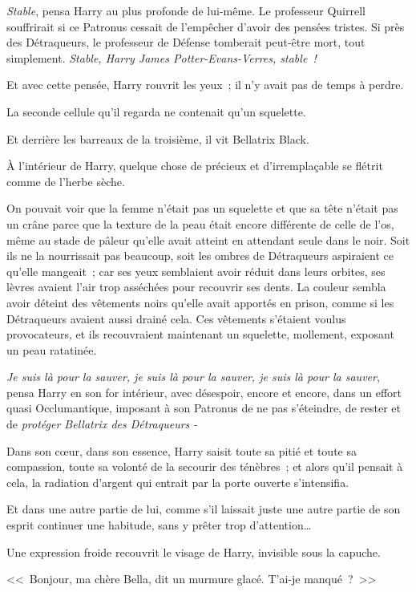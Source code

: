 \emph{Stable}, pensa Harry au plus profonde de lui-même. Le professeur Quirrell souffrirait si ce Patronus cessait de l'empêcher d'avoir des pensées tristes. Si près des Détraqueurs, le professeur de Défense tomberait peut-être mort, tout simplement. \emph{Stable, Harry James Potter-Evans-Verres, stable~!}

Et avec cette pensée, Harry rouvrit les yeux~; il n'y avait pas de temps à perdre.

La seconde cellule qu'il regarda ne contenait qu'un squelette.

Et derrière les barreaux de la troisième, il vit Bellatrix Black.

À l'intérieur de Harry, quelque chose de précieux et d'irremplaçable se flétrit comme de l'herbe sèche.

On pouvait voir que la femme n'était pas un squelette et que sa tête n'était pas un crâne parce que la texture de la peau était encore différente de celle de l'os, même au stade de pâleur qu'elle avait atteint en attendant seule dans le noir. Soit ils ne la nourrissait pas beaucoup, soit les ombres de Détraqueurs aspiraient ce qu'elle mangeait~; car ses yeux semblaient avoir réduit dans leurs orbites, ses lèvres avaient l'air trop asséchées pour recouvrir ses dents. La couleur sembla avoir déteint des vêtements noirs qu'elle avait apportés en prison, comme si les Détraqueurs avaient aussi drainé cela. Ces vêtements s'étaient voulus provocateurs, et ils recouvraient maintenant un squelette, mollement, exposant un peau ratatinée.

\emph{Je suis là pour la sauver, je suis là pour la sauver, je suis là pour la sauver}, pensa Harry en son for intérieur, avec désespoir, encore et encore, dans un effort quasi Occlumantique, imposant à son Patronus de ne pas s'éteindre, de rester et de \emph{protéger Bellatrix des Détraqueurs -}

Dans son cœur, dans son essence, Harry saisit toute sa pitié et toute sa compassion, toute sa volonté de la secourir des ténèbres~; et alors qu'il pensait à cela, la radiation d'argent qui entrait par la porte ouverte s'intensifia.

Et dans une autre partie de lui, comme s'il laissait juste une autre partie de son esprit continuer une habitude, sans y prêter trop d'attention…

Une expression froide recouvrit le visage de Harry, invisible sous la capuche.

<<~Bonjour, ma chère Bella, dit un murmure glacé. T'ai-je manqué~?~>>
